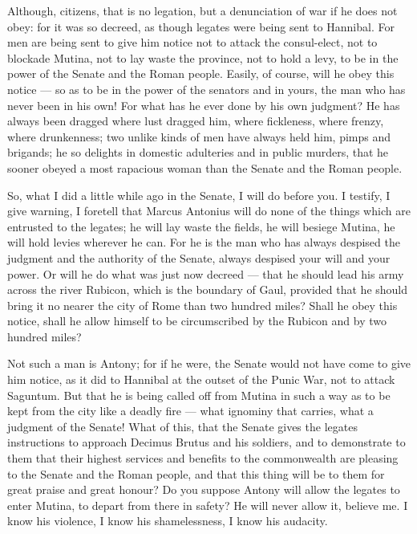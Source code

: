  Although, citizens, that is no legation, but a denunciation of war if he does not obey: for it was so decreed, as though legates were being sent to Hannibal. For men are being sent to give him notice not to attack the consul-elect, not to blockade Mutina, not to lay waste the province, not to hold a levy, to be in the power of the Senate and the Roman people. Easily, of course, will he obey this notice --- so as to be in the power of the senators and in yours, the man who has never been in his own! For what has he ever done by his own judgment? He has always been dragged where lust dragged him, where fickleness, where frenzy, where drunkenness; two unlike kinds of men have always held him, pimps and brigands; he so delights in domestic adulteries and in public murders, that he sooner obeyed a most rapacious woman than the Senate and the Roman people.

 So, what I did a little while ago in the Senate, I will do before you. I testify, I give warning, I foretell that Marcus Antonius will do none of the things which are entrusted to the legates; he will lay waste the fields, he will besiege Mutina, he will hold levies wherever he can. For he is the man who has always despised the judgment and the authority of the Senate, always despised your will and your power. Or will he do what was just now decreed --- that he should lead his army across the river Rubicon, which is the boundary of Gaul, provided that he should bring it no nearer the city of Rome than two hundred miles? Shall he obey this notice, shall he allow himself to be circumscribed by the Rubicon and by two hundred miles?

 Not such a man is Antony; for if he were, the Senate would not have come to give him notice, as it did to Hannibal at the outset of the Punic War, not to attack Saguntum. But that he is being called off from Mutina in such a way as to be kept from the city like a deadly fire --- what ignominy that carries, what a judgment of the Senate! What of this, that the Senate gives the legates instructions to approach Decimus Brutus and his soldiers, and to demonstrate to them that their highest services and benefits to the commonwealth are pleasing to the Senate and the Roman people, and that this thing will be to them for great praise and great honour? Do you suppose Antony will allow the legates to enter Mutina, to depart from there in safety? He will never allow it, believe me. I know his violence, I know his shamelessness, I know his audacity.

